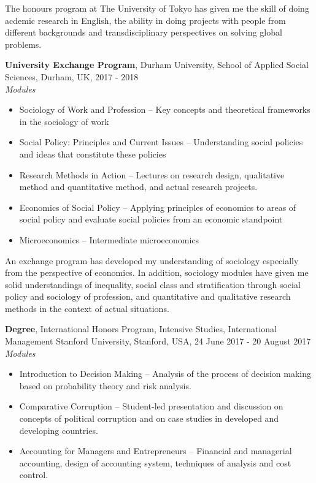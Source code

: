 \documentclass[11pt, a4paper]{article}
\begin{document}
The honours program at The University of Tokyo has given me the skill of doing acdemic research in English, the ability in doing projects with people from different backgrounds and transdisciplinary perspectives on solving global problems.


\textbf{University Exchange Program}, Durham University, School of Applied Social Sciences, Durham, UK, 2017 - 2018 \\
\textit{Modules} \\
\begin{itemize}[leftmargin=*]
    \item Sociology of Work and Profession – Key concepts and theoretical frameworks in the sociology of work \\
    \item Social Policy: Principles and Current Issues – Understanding social policies and ideas that constitute these policies \\
    \item Research Methods in Action – Lectures on research design, qualitative method and quantitative method, and actual research projects. \\
    \item Economics of Social Policy – Applying principles of economics to areas of social policy and evaluate social policies from an economic standpoint \\
    \item Microeconomics – Intermediate microeconomics \\
\end{itemize}

An exchange program has developed my understanding of sociology especially from the perspective of economics. In addition, sociology modules have given me solid understandings of inequality, social class and stratification through social policy and sociology of profession, and quantitative and qualitative research methods in the context of actual situations.

    
\textbf{Degree}, International Honors Program, Intensive Studies, International Management Stanford University, Stanford, USA, 24 June 2017 - 20 August 2017 \\
\textit{Modules} \\
\begin{itemize}[leftmargin=*]
    \item Introduction to Decision Making – Analysis of the process of decision making based on probability theory and risk analysis. \\
    \item Comparative Corruption – Student-led presentation and discussion on concepts of political corruption and on case studies in developed and developing countries. \\
    \item Accounting for Managers and Entrepreneurs – Financial and managerial accounting, design of accounting system, techniques of analysis and cost control. \\
\end{itemize}
\end{document}
